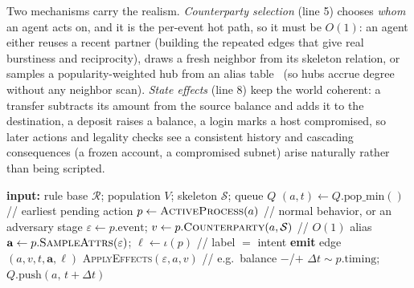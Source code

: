 \documentclass[sigconf,review,anonymous]{acmart}
\newcommand{\sys}{\textsc{Agora}\xspace}
\begin{document}
Two mechanisms carry the realism. \emph{Counterparty
selection} (line 5) chooses \emph{whom} an agent acts on, and it is the per-event hot
path, so it must be $O(1)$: an agent either reuses a recent partner (building the
repeated edges that give real burstiness and reciprocity), draws a fresh neighbor from
its skeleton relation, or samples a popularity-weighted hub from an alias
table~\cite{walker1977alias,vose1991alias} (so hubs accrue degree without any neighbor
scan). \emph{State effects} (line 8) keep the world coherent: a transfer subtracts its
amount from the source balance and adds it to the destination, a deposit raises a
balance, a login marks a host compromised, so later actions and legality checks see a
consistent history and cascading consequences (a frozen account, a compromised subnet)
arise naturally rather than being scripted.

\begin{algorithm}[t]
\caption{\sys{} generation (one causal block, run per thread)}
\label{alg:loop}
\small
\begin{algorithmic}[1]
\STATE \textbf{input:} rule base $\mathcal{R}$; population $V$; skeleton $\mathcal{S}$; queue $Q$
  \STATE $(a,t) \gets Q.\text{pop\_min}()$ \hfill// earliest pending action
  \STATE $p \gets \textsc{ActiveProcess}(a)$ \hfill// normal behavior, or an adversary stage
  \STATE $\varepsilon \gets p.\text{event}$;\; $v \gets p.\textsc{Counterparty}(a,\mathcal{S})$ \hfill// $O(1)$ alias
  \STATE $\mathbf{a} \gets p.\textsc{SampleAttrs}(\varepsilon)$;\; $\ell \gets \iota(p)$ \hfill// label $=$ intent
  \STATE \textbf{emit} edge $(a, v, t, \mathbf{a}, \ell)$
  \STATE \textsc{ApplyEffects}$(\varepsilon, a, v)$ \hfill// e.g.\ balance $-$/$+$
  \STATE $\Delta t \sim p.\text{timing}$;\; $Q.\text{push}(a,\, t{+}\Delta t)$
\ENDWHILE
\end{algorithmic}
\end{algorithm}
\end{document}
